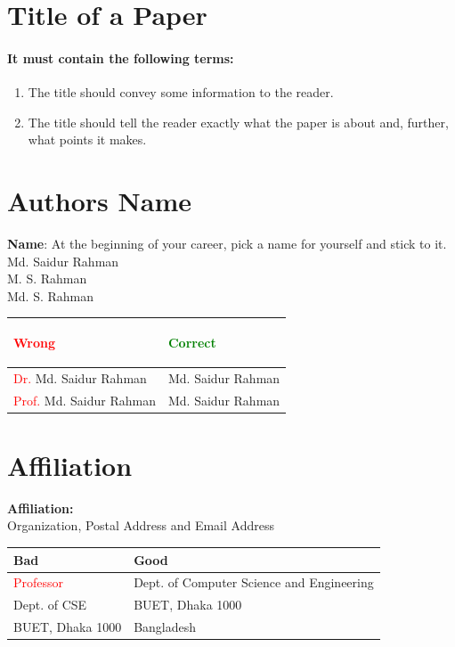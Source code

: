 \documentclass[20pt]{report}
\begin{document}
 \section{Title of a Paper} 
 \paragraph{It must contain the following terms: }
 \begin{enumerate}
  \item The title should convey some information to the reader.
  \item The title should tell the reader exactly what the paper is
about and, further, what points it makes.
  \end{enumerate} 
  
  \section{Authors Name}
   \textbf {Name}: At the beginning of your career, pick a name for yourself
and stick to it.\\
Md. Saidur Rahman\\
M. S. Rahman\\
Md. S. Rahman
  \begin{center}
\begin{tabular}[t]{|p{}|p{}|}
\hline
\begin{center}
\textcolor{red}{Wrong}
\end{center}  & \begin{center}
\textcolor{green}{Correct}
\end{center} \\
\hline
\textcolor{red}{Dr.} Md. Saidur Rahman & Md. Saidur Rahman\\
\hline
\textcolor{red}{Prof.} Md. Saidur Rahman & Md. Saidur Rahman\\
\hline
\end{tabular}
\end{center}

 \section{Affiliation}
   \textbf {Affiliation:} \\
   Organization, Postal Address and Email Address
  \begin{center}
\begin{tabular}[t]{|p{}|p{}|}
\hline
Bad & Good \\
\hline
\textcolor{red}{Professor} & Dept. of Computer Science and Engineering\\
\hline
Dept. of CSE & BUET, Dhaka 1000\\
\hline
\hline
BUET, Dhaka 1000 & Bangladesh\\
\hline
\end{tabular}
\end{center}
\end{document}
